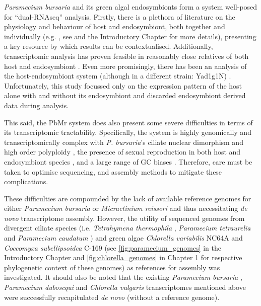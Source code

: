 \textit{Paramecium bursaria} and its green algal endosymbionts form a system well-posed
for ``dual-RNAseq'' analysis.  Firstly, there is a plethora 
of literature on the physiology and behaviour of host and endosymbiont, both together and individually
(e.g. \citep{Iwatsuki1988}, see \citep{Kato2009a} and the Introductory Chapter for more details), presenting 
a key resource by which results can be contextualised.
Additionally, transcriptomic analysis has proven feasible in reasonably close relatives of both host \citep{Arnaiz2010,Kolisko2014} and endosymbiont \citep{Guarnieri2011,Rowe2014,Bashan2015}.  
Even more promisingly, there has been an analysis of the host-endosymbiont
system (although in a different strain: Yad1g1N) \citep{Kodama2014}. 
Unfortunately, this study focussed only on the expression pattern of the host
alone with and without its endosymbiont and discarded endosymbiont derived data
during analysis.


This said, the PbMr system does also present some severe difficulties in terms of its transcriptomic tractability.
Specifically, the system is highly genomically and transcriptomically complex with \textit{P. bursaria}'s ciliate nuclear
dimorphism and high order polyploidy \citep{Raikov1995}, 
the presence of sexual reproduction in both host \citep{Jennings1939} and endosymbiont species \citep{Blanc2010},
and a large range of GC biases \citep{Kodama2014}. Therefore, care must be taken to optimise sequencing,
and assembly methods to mitigate these complications.


These difficulties are compounded by the lack of available reference genomes for either \textit{Paramecium bursaria} or \textit{Micractinium reisseri} and thus necessitating \textit{de novo} transcriptome assembly.
However, the utility of sequenced genomes from divergent ciliate species 
(i.e. \textit{Tetrahymena thermophila} \citep{Eisen2006}, \textit{Paramecium tetraurelia} \citep{Aury2006} and \textit{Paramecium caudatum}
\citep{McGrath2014}) and green algae \textit{Chlorella variabilis} NC64A \citep{Blanc2010} and \textit{Coccomyxa subellipsoidea} C-169 \citep{Blanc2012}
(see \cref{fig:paramecium_genomes} in the Introductory Chapter and \cref{fig:chlorella_genomes} in Chapter 1 for respective phylogenetic context of these genomes) as references for assembly was investigated.
It should also be noted that the existing \textit{Paramecium bursaria} \citep{Kodama2014}, 
\textit{Paramecium duboscqui} \citep{Kolisko2014} and
\textit{Chlorella vulgaris} \citep{Guarnieri2011} transcriptomes mentioned above were
successfully recapitulated \textit{de novo} (without a reference genome).


